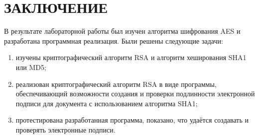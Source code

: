 \chapter*{ЗАКЛЮЧЕНИЕ}

В результате лабораторной работы был изучен алгоритма шифрования AES и разработана программная реализация. Были решены следующие задачи:

\begin{enumerate}[label=---]
	\item изучены криптографический алгоритм RSA и алгоритм хеширования SHA1 или MD5;
	\item реализован криптографический алгоритм RSA в виде программы, обеспечивающий возможности создания и проверки подлинности электронной подписи для документа с использованием алгоритма SHA1;
	\item протестирована разработанная программа, показано, что удаётся создавать и проверять электронные подписи.
\end{enumerate}